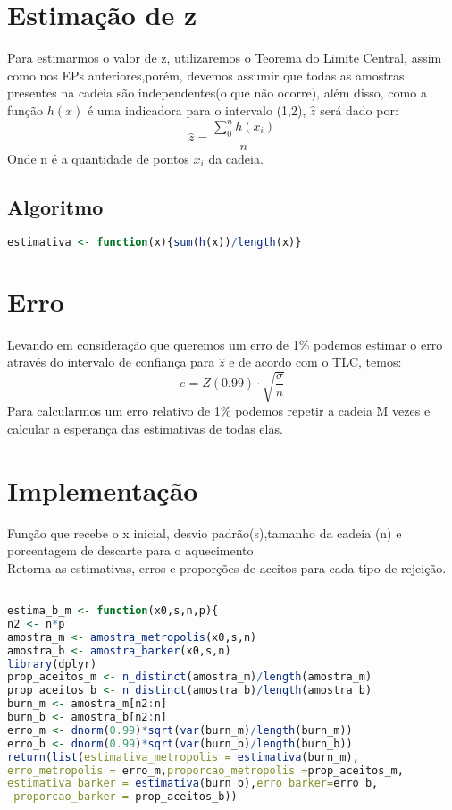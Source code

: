 \documentclass{article}
\begin{document}
\section{Estimação de z}
Para estimarmos o valor de z, utilizaremos o Teorema do Limite Central, assim como nos EPs anteriores,porém, devemos assumir que todas as amostras presentes na cadeia são independentes(o que não ocorre), além disso, como a função $h(x)$ é uma indicadora para o intervalo (1,2), $\widehat{z}$ será dado por:
\begin{equation}
\widehat{z}=\frac{\sum_{0}^{n}h(x_i)}{n}
\end{equation}
Onde n é a quantidade de pontos $x_i$ da cadeia.
\subsection{Algoritmo}
\begin{lstlisting}[language=R]
estimativa <- function(x){sum(h(x))/length(x)}
\end{lstlisting}
\section{Erro}
Levando em consideração que queremos um erro de 1\% podemos estimar o erro através do intervalo de confiança para $\widehat{z}$ e de acordo com o TLC, temos:
\begin{equation}
e = Z(0.99)\cdot\sqrt{\frac{\sigma}{n}}
\end{equation}
Para calcularmos um erro relativo de 1\% podemos repetir a cadeia M vezes e calcular a esperança das estimativas de todas elas.
\section{Implementação}
Função que recebe o x inicial, desvio padrão(s),tamanho da cadeia (n) e porcentagem de descarte para o aquecimento\\
Retorna as estimativas, erros e proporções de aceitos para cada tipo de rejeição.
\begin{lstlisting}[language=R]

estima_b_m <- function(x0,s,n,p){
n2 <- n*p
amostra_m <- amostra_metropolis(x0,s,n)
amostra_b <- amostra_barker(x0,s,n)
library(dplyr)
prop_aceitos_m <- n_distinct(amostra_m)/length(amostra_m)
prop_aceitos_b <- n_distinct(amostra_b)/length(amostra_b)
burn_m <- amostra_m[n2:n]
burn_b <- amostra_b[n2:n]
erro_m <- dnorm(0.99)*sqrt(var(burn_m)/length(burn_m))
erro_b <- dnorm(0.99)*sqrt(var(burn_b)/length(burn_b))
return(list(estimativa_metropolis = estimativa(burn_m),
erro_metropolis = erro_m,proporcao_metropolis =prop_aceitos_m,
estimativa_barker = estimativa(burn_b),erro_barker=erro_b,
 proporcao_barker = prop_aceitos_b))
\end{lstlisting}
\end{document}
